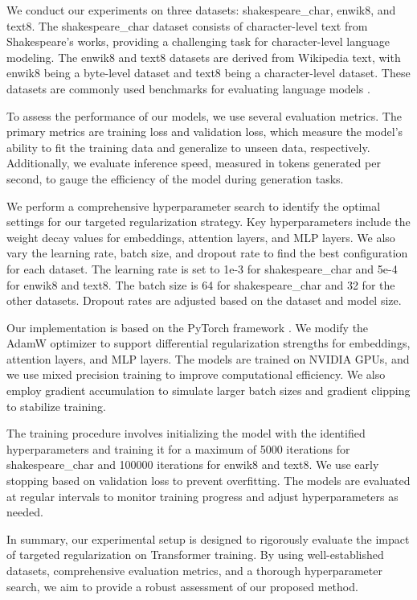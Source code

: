 \documentclass{article} %
\begin{document}
We conduct our experiments on three datasets: shakespeare\_char, enwik8, and text8. The shakespeare\_char dataset consists of character-level text from Shakespeare's works, providing a challenging task for character-level language modeling. The enwik8 and text8 datasets are derived from Wikipedia text, with enwik8 being a byte-level dataset and text8 being a character-level dataset. These datasets are commonly used benchmarks for evaluating language models \citep{karpathy2023nanogpt}.

To assess the performance of our models, we use several evaluation metrics. The primary metrics are training loss and validation loss, which measure the model's ability to fit the training data and generalize to unseen data, respectively. Additionally, we evaluate inference speed, measured in tokens generated per second, to gauge the efficiency of the model during generation tasks.

We perform a comprehensive hyperparameter search to identify the optimal settings for our targeted regularization strategy. Key hyperparameters include the weight decay values for embeddings, attention layers, and MLP layers. We also vary the learning rate, batch size, and dropout rate to find the best configuration for each dataset. The learning rate is set to 1e-3 for shakespeare\_char and 5e-4 for enwik8 and text8. The batch size is 64 for shakespeare\_char and 32 for the other datasets. Dropout rates are adjusted based on the dataset and model size.

Our implementation is based on the PyTorch framework \citep{paszke2019pytorch}. We modify the AdamW optimizer \citep{loshchilov2017adamw} to support differential regularization strengths for embeddings, attention layers, and MLP layers. The models are trained on NVIDIA GPUs, and we use mixed precision training to improve computational efficiency. We also employ gradient accumulation to simulate larger batch sizes and gradient clipping to stabilize training.

The training procedure involves initializing the model with the identified hyperparameters and training it for a maximum of 5000 iterations for shakespeare\_char and 100000 iterations for enwik8 and text8. We use early stopping based on validation loss to prevent overfitting. The models are evaluated at regular intervals to monitor training progress and adjust hyperparameters as needed.

In summary, our experimental setup is designed to rigorously evaluate the impact of targeted regularization on Transformer training. By using well-established datasets, comprehensive evaluation metrics, and a thorough hyperparameter search, we aim to provide a robust assessment of our proposed method.
\end{document}

